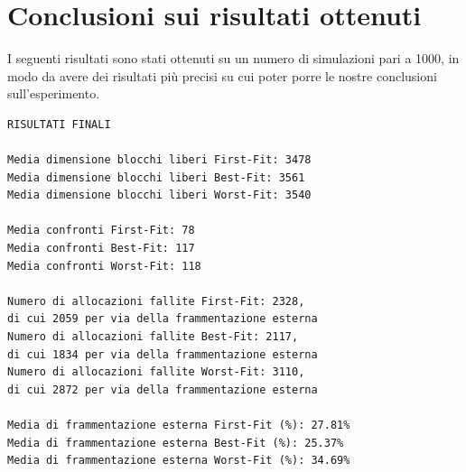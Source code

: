 \documentclass[20pt,a4paper,oneside]{article}
\begin{document}
\newpage

\section{Conclusioni sui risultati ottenuti}
I seguenti risultati sono stati ottenuti su un numero di simulazioni pari a 1000, in modo da avere dei risultati più precisi su cui poter porre le nostre conclusioni sull'esperimento.
\begin{verbatim}
RISULTATI FINALI

Media dimensione blocchi liberi First-Fit: 3478
Media dimensione blocchi liberi Best-Fit: 3561
Media dimensione blocchi liberi Worst-Fit: 3540

Media confronti First-Fit: 78
Media confronti Best-Fit: 117
Media confronti Worst-Fit: 118

Numero di allocazioni fallite First-Fit: 2328, 
di cui 2059 per via della frammentazione esterna
Numero di allocazioni fallite Best-Fit: 2117, 
di cui 1834 per via della frammentazione esterna
Numero di allocazioni fallite Worst-Fit: 3110,
di cui 2872 per via della frammentazione esterna

Media di frammentazione esterna First-Fit (%): 27.81%
Media di frammentazione esterna Best-Fit (%): 25.37%
Media di frammentazione esterna Worst-Fit (%): 34.69%
\end{verbatim}
\end{document}
